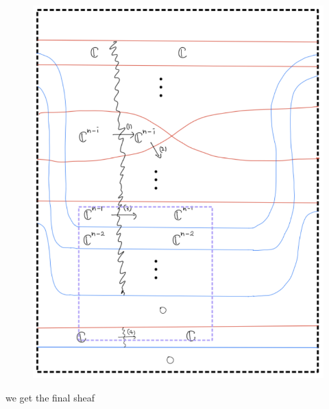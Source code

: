 \begin{enumerate}[label = (\roman*)]
\begin{enumerate}[label = (Case \arabic*)]
\begin{enumerate}[label = (Step \arabic*)]
\begin{figure}[H]
    \centering
    \includegraphics[scale = 0.95]{diagrams/cobord_gen/7.png}
    \caption{}
    \label{fig:your-label}
\end{figure}
\pagebreak
we get the final sheaf


\end{enumerate}
\end{enumerate}
\end{enumerate}
